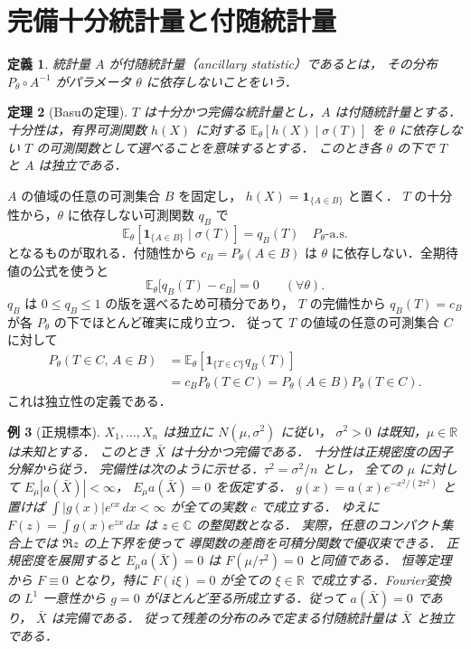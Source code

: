 \documentclass[a5paper,10pt,onecolumn]{jsarticle}
\makeatletter
\theoremstyle{mathnotetheorem}
\newtheorem{theorem}{定理}[section]
\newtheorem{definition}[theorem]{定義}
\newtheorem{example}[theorem]{例}
\renewcommand{\proofname}{証明}
\renewenvironment{proof}[1][\proofname]{%
  \par\pushQED{\qed}\normalfont\topsep4\p@\@plus2\p@\relax
  \trivlist\item[\hskip\labelsep\bfseries #1]\ignorespaces
}{\popQED\endtrivlist\@endpefalse}
\makeatother
\begin{document}
\section{完備十分統計量と付随統計量}
\begin{definition}
統計量 $A$ が\emph{付随統計量}（ancillary statistic）であるとは，
その分布 $P_\theta\circ A^{-1}$ がパラメータ $\theta$ に依存しないことをいう．
\end{definition}
\begin{theorem}[Basuの定理]
$T$ は十分かつ完備な統計量とし，$A$ は付随統計量とする．
十分性は，有界可測関数 $h(X)$ に対する
$\mathbb E_\theta[h(X)\mid\sigma(T)]$ を
$\theta$ に依存しない $T$ の可測関数として選べることを意味するとする．
このとき各 $\theta$ の下で $T$ と $A$ は独立である．
\end{theorem}
\begin{proof}
$A$ の値域の任意の可測集合 $B$ を固定し，
$h(X)=\mathbf1_{\{A\in B\}}$ と置く．
$T$ の十分性から，$\theta$ に依存しない可測関数 $q_B$ で
\[
 \mathbb E_\theta[\mathbf1_{\{A\in B\}}\mid\sigma(T)]
 =q_B(T)\quad P_\theta\text{-a.s.}
\]
となるものが取れる．付随性から $c_B=P_\theta(A\in B)$ は
$\theta$ に依存しない．全期待値の公式を使うと
\[
 \mathbb E_\theta\bigl[q_B(T)-c_B\bigr]=0
 \qquad(\forall\theta).
\]
$q_B$ は $0\le q_B\le1$ の版を選べるため可積分であり，
$T$ の完備性から $q_B(T)=c_B$ が各 $P_\theta$ の下でほとんど確実に成り立つ．
従って $T$ の値域の任意の可測集合 $C$ に対して
\begin{align*}
 P_\theta(T\in C,\,A\in B)
 &=\mathbb E_\theta[\mathbf1_{\{T\in C\}}q_B(T)]\\
 &=c_B P_\theta(T\in C)
 =P_\theta(A\in B)P_\theta(T\in C).
\end{align*}
これは独立性の定義である．
\end{proof}
\begin{example}[正規標本]
$X_1,\ldots,X_n$ は独立に $N(\mu,\sigma^2)$ に従い，
$\sigma^2>0$ は既知，$\mu\in\mathbb R$ は未知とする．
このとき $\bar X$ は十分かつ完備である．
十分性は正規密度の因子分解から従う．
完備性は次のように示せる．$\tau^2=\sigma^2/n$ とし，
全ての $\mu$ に対して $E_\mu|a(\bar X)|<\infty$，
$E_\mu a(\bar X)=0$ を仮定する．
$g(x)=a(x)e^{-x^2/(2\tau^2)}$ と置けば
$\int|g(x)|e^{cx}\,dx<\infty$ が全ての実数 $c$ で成立する．
ゆえに $F(z)=\int g(x)e^{zx}\,dx$ は $z\in\mathbb C$ の整関数となる．
実際，任意のコンパクト集合上では $\Re z$ の上下界を使って
導関数の差商を可積分関数で優収束できる．
正規密度を展開すると
$E_\mu a(\bar X)=0$ は $F(\mu/\tau^2)=0$ と同値である．
恒等定理から $F\equiv0$ となり，特に $F(i\xi)=0$ が全ての
$\xi\in\mathbb R$ で成立する．Fourier変換の $L^1$ 一意性から
$g=0$ がほとんど至る所成立する．従って $a(\bar X)=0$ であり，
$\bar X$ は完備である．
従って残差の分布のみで定まる付随統計量は $\bar X$ と独立である．
\end{example}
\end{document}
